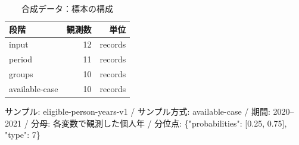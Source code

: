 \begin{table}[htbp]
\centering
\begin{tabular}{lrr}
\hline
段階 & 観測数 & 単位 \\
\hline
input & 12 & records \\
period & 11 & records \\
groups & 10 & records \\
available-case & 10 & records \\
\hline
\end{tabular}
\caption{合成データ：標本の構成}
\par\small サンプル: eligible-person-years-v1 / サンプル方式: available-case / 期間: 2020–2021 / 分母: 各変数で観測した個人年 / 分位点: \{"probabilities": [0.25, 0.75], "type": 7\}
\end{table}
